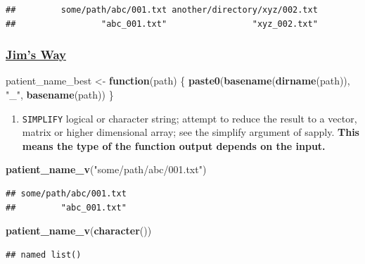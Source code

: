 \documentclass[]{book}
\newenvironment{Shaded}{\begin{snugshade}}{\end{snugshade}}
\newcommand{\ControlFlowTok}[1]{\textcolor[rgb]{0.13,0.29,0.53}{\textbf{#1}}}
\newcommand{\KeywordTok}[1]{\textcolor[rgb]{0.13,0.29,0.53}{\textbf{#1}}}
\newcommand{\NormalTok}[1]{#1}
\newcommand{\StringTok}[1]{\textcolor[rgb]{0.31,0.60,0.02}{#1}}
\providecommand{\tightlist}{%
  \setlength{\itemsep}{0pt}\setlength{\parskip}{0pt}}
\begin{document}
\begin{verbatim}
##         some/path/abc/001.txt another/directory/xyz/002.txt 
##                 "abc_001.txt"                 "xyz_002.txt"
\end{verbatim}

\hypertarget{jims-way}{%
\subsubsection{\texorpdfstring{\href{https://www.jimhester.com/post/2018-04-12-vectorize/}{Jim's Way}}{Jim's Way}}\label{jims-way}}

\begin{Shaded}
\begin{Highlighting}[]
\NormalTok{patient_name_best <-}\StringTok{ }\ControlFlowTok{function}\NormalTok{(path) \{}
  \KeywordTok{paste0}\NormalTok{(}\KeywordTok{basename}\NormalTok{(}\KeywordTok{dirname}\NormalTok{(path)), }\StringTok{"_"}\NormalTok{, }\KeywordTok{basename}\NormalTok{(path))}
\NormalTok{\}}
\end{Highlighting}
\end{Shaded}

\begin{enumerate}
\def\labelenumi{\arabic{enumi}.}
\tightlist
\item
  \texttt{SIMPLIFY} logical or character string; attempt to reduce the result to a vector, matrix or higher dimensional array; see the simplify argument of sapply. \textbf{This means the type of the function output depends on the input.}
\end{enumerate}

\begin{Shaded}
\begin{Highlighting}[]
\KeywordTok{patient_name_v}\NormalTok{(}\StringTok{"some/path/abc/001.txt"}\NormalTok{)}
\end{Highlighting}
\end{Shaded}

\begin{verbatim}
## some/path/abc/001.txt 
##         "abc_001.txt"
\end{verbatim}

\begin{Shaded}
\begin{Highlighting}[]
\KeywordTok{patient_name_v}\NormalTok{(}\KeywordTok{character}\NormalTok{())}
\end{Highlighting}
\end{Shaded}

\begin{verbatim}
## named list()
\end{verbatim}
\end{document}
